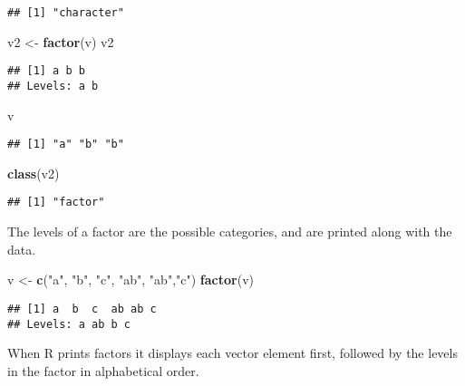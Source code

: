 \documentclass[
]{article}
\newenvironment{Shaded}{\begin{snugshade}}{\end{snugshade}}
\newcommand{\KeywordTok}[1]{\textcolor[rgb]{0.13,0.29,0.53}{\textbf{#1}}}
\newcommand{\NormalTok}[1]{#1}
\newcommand{\StringTok}[1]{\textcolor[rgb]{0.31,0.60,0.02}{#1}}
\begin{document}
\begin{verbatim}
## [1] "character"
\end{verbatim}

\begin{Shaded}
\begin{Highlighting}[]
\NormalTok{v2 <-}\StringTok{ }\KeywordTok{factor}\NormalTok{(v)}
\NormalTok{v2}
\end{Highlighting}
\end{Shaded}

\begin{verbatim}
## [1] a b b
## Levels: a b
\end{verbatim}

\begin{Shaded}
\begin{Highlighting}[]
\NormalTok{v}
\end{Highlighting}
\end{Shaded}

\begin{verbatim}
## [1] "a" "b" "b"
\end{verbatim}

\begin{Shaded}
\begin{Highlighting}[]
\KeywordTok{class}\NormalTok{(v2)}
\end{Highlighting}
\end{Shaded}

\begin{verbatim}
## [1] "factor"
\end{verbatim}

The levels of a factor are the possible categories, and are printed
along with the data.

\begin{Shaded}
\begin{Highlighting}[]
\NormalTok{v <-}\StringTok{ }\KeywordTok{c}\NormalTok{(}\StringTok{"a"}\NormalTok{, }\StringTok{"b"}\NormalTok{, }\StringTok{"c"}\NormalTok{, }\StringTok{"ab"}\NormalTok{, }\StringTok{"ab"}\NormalTok{,}\StringTok{"c"}\NormalTok{)}
\KeywordTok{factor}\NormalTok{(v)}
\end{Highlighting}
\end{Shaded}

\begin{verbatim}
## [1] a  b  c  ab ab c 
## Levels: a ab b c
\end{verbatim}

When R prints factors it displays each vector element first, followed by
the levels in the factor in alphabetical order.
\end{document}
